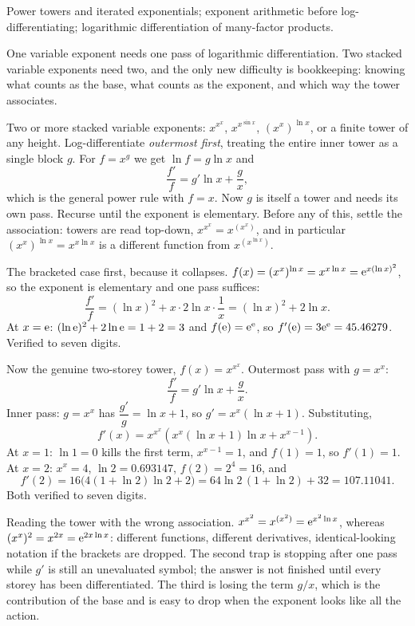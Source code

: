 \begin{seealsob}Power towers and iterated exponentials; exponent arithmetic before log-differentiating; logarithmic differentiation of many-factor products.\end{seealsob}

One variable exponent needs one pass of logarithmic differentiation. Two stacked variable exponents need two, and the only new difficulty is bookkeeping: knowing what counts as the base, what counts as the exponent, and which way the tower associates.

\cue Two or more stacked variable exponents: $x^{x^{x}}$, $x^{x^{\sin x}}$, $(x^{x})^{\ln x}$, or a finite tower of any height.
\method Log-differentiate \emph{outermost first}, treating the entire inner tower as a single block $g$. For $f=x^{g}$ we get $\ln f=g\ln x$ and
\[
\frac{f'}{f}=g'\ln x+\frac gx ,
\]
which is the general power rule with $f=x$. Now $g$ is itself a tower and needs its own pass. Recurse until the exponent is elementary. Before any of this, settle the association: towers are read top-down, $x^{x^{x}}=x^{(x^{x})}$, and in particular $(x^{x})^{\ln x}=x^{x\ln x}$ is a different function from $x^{(x^{\ln x})}$.

\begin{worked}
The bracketed case first, because it collapses. $f(x)=(x^{x})^{\ln x}=x^{x\ln x}=\mathrm{e}^{x(\ln x)^{2}}$, so the exponent is elementary and one pass suffices:
\[
\frac{f'}{f}=(\ln x)^{2}+x\cdot2\ln x\cdot\frac1x=(\ln x)^{2}+2\ln x .
\]
At $x=\mathrm{e}$: $(\ln \mathrm{e})^{2}+2\ln \mathrm{e}=1+2=3$ and $f(\mathrm{e})=\mathrm{e}^{\mathrm{e}}$, so $f'(\mathrm{e})=3\mathrm{e}^{\mathrm{e}}=45.46279$. Verified to seven digits.

Now the genuine two-storey tower, $f(x)=x^{x^{x}}$. Outermost pass with $g=x^{x}$:
\[
\frac{f'}{f}=g'\ln x+\frac gx .
\]
Inner pass: $g=x^{x}$ has $\dfrac{g'}{g}=\ln x+1$, so $g'=x^{x}(\ln x+1)$. Substituting,
\[
f'(x)=x^{x^{x}}\left(x^{x}(\ln x+1)\ln x+x^{x-1}\right).
\]
At $x=1$: $\ln1=0$ kills the first term, $x^{x-1}=1$, and $f(1)=1$, so $f'(1)=1$. At $x=2$: $x^{x}=4$, $\ln2=0.693147$, $f(2)=2^{4}=16$, and
\[
f'(2)=16\bigl(4(1+\ln2)\ln2+2\bigr)=64\ln2\,(1+\ln2)+32=107.11041 .
\]
Both verified to seven digits.
\end{worked}

\begin{trap}
Reading the tower with the wrong association. $x^{x^{2}}=x^{(x^{2})}=\mathrm{e}^{x^{2}\ln x}$, whereas $(x^{x})^{2}=x^{2x}=\mathrm{e}^{2x\ln x}$: different functions, different derivatives, identical-looking notation if the brackets are dropped. The second trap is stopping after one pass while $g'$ is still an unevaluated symbol; the answer is not finished until every storey has been differentiated. The third is losing the term $g/x$, which is the contribution of the base and is easy to drop when the exponent looks like all the action.
\end{trap}

